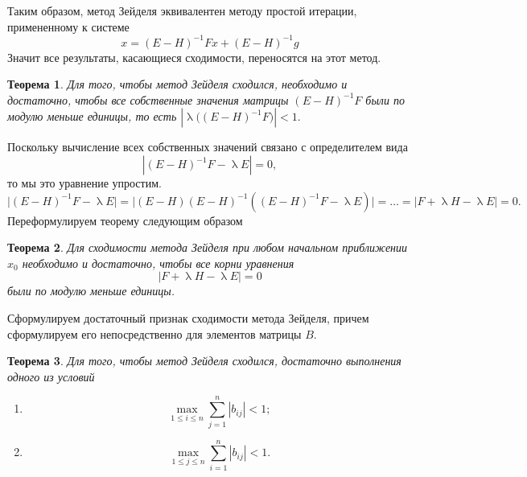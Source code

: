\documentclass[a4paper, 12pt]{report}
\renewcommand{\leq}{\leqslant}
\renewcommand{\lambda}{\uplambda}
\newtheorem*{theorem}{Теорема}
\begin{document}
	Таким образом, метод Зейделя эквивалентен методу простой итерации, примененному к системе $$x = (E-H)^{-1}Fx + (E-H)^{-1}g$$
	Значит все результаты, касающиеся сходимости, переносятся на этот метод.
	\begin{theorem}
		Для того, чтобы метод Зейделя сходился, необходимо и достаточно, чтобы все собственные значения матрицы $(E-H)^{-1}F$ были по модулю меньше единицы, то есть $|\lambda\big((E-H)^{-1}F\big)| < 1.$
	\end{theorem}
	Поскольку вычисление всех собственных значений связано с определителем вида $$|(E-H)^{-1}F - \lambda E| = 0,$$ то мы это уравнение упростим.
	$$\Big|(E-H)^{-1}F - \lambda E\Big| = \Big|(E-H)(E-H)^{-1} ((E-H)^{-1}F - \lambda E)\Big|=\ldots=|F+\lambda H - \lambda E| = 0.$$
	Переформулируем теорему следующим образом
	\begin{theorem}
		Для сходимости метода Зейделя при любом начальном приближении $x_0$ необходимо и достаточно, чтобы все корни уравнения
		$$|F+\lambda H - \lambda E| = 0$$ были по модулю меньше единицы.
	\end{theorem}
	Сформулируем достаточный признак сходимости метода Зейделя, причем сформулируем его непосредственно для элементов матрицы $B$.
	\begin{theorem}
		Для того, чтобы метод Зейделя сходился, достаточно выполнения одного из условий \begin{enumerate}
			\item $$\underset{1\leq i \leq n}{\max}\sum_{j=1}^{n}|b_{ij}| < 1;$$
			\item $$\underset{1\leq j \leq n}{\max}\sum_{i=1}^{n}|b_{ij}| < 1.$$
		\end{enumerate}
	\end{theorem}
\end{document}
